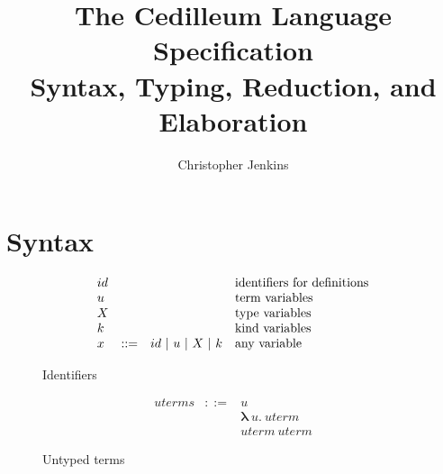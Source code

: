 \documentclass{article}
\begin{document}
\title{The Cedilleum Language Specification \\ \large Syntax, Typing, Reduction,
  and Elaboration }

\author{Christopher Jenkins}

\maketitle

\section{Syntax}

\begin{figure}[h]
  \[
    \begin{array}{llll}
      id & & & \textnormal{identifiers for definitions}
      \\ u & & & \textnormal{term variables}
      \\ X & & & \textnormal{type variables}
      \\ k & & & \textnormal{kind variables}
      \\ x
         & ::= & id\ |\ u\ |\ X\ |\ k
             & \textnormal{any variable}
    \end{array}
  \]
  \caption{Identifiers}
\end{figure}

\begin{figure}[h]
  \[
    \begin{array}{llll}
      uterms
      & ::= & u
      \\ & & \textbf{λ}\ u \textbf{.}\ uterm
      \\ & & uterm\ uterm
    \end{array}
  \]
  \caption{Untyped terms}
\end{figure}
\end{document}
